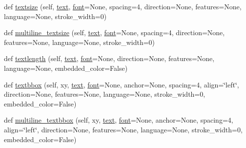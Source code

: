 \begin{DoxyCompactItemize}
\item 
def \hyperlink{classPIL_1_1ImageDraw_1_1ImageDraw_a54669e83a0653b1501b9e60efdc0ee0c}{textsize} (self, \hyperlink{classPIL_1_1ImageDraw_1_1ImageDraw_a13be584a7af12b6ed0b118bfb15f6030}{text}, \hyperlink{classPIL_1_1ImageDraw_1_1ImageDraw_a1a0babedef110fd4d10b55fa4041024d}{font}=None, spacing=4, direction=None, features=None, language=None, stroke\+\_\+width=0)
\item 
def \hyperlink{classPIL_1_1ImageDraw_1_1ImageDraw_af7cc0cddefee8cb0b2c4d4ce0fa1e0c4}{multiline\+\_\+textsize} (self, \hyperlink{classPIL_1_1ImageDraw_1_1ImageDraw_a13be584a7af12b6ed0b118bfb15f6030}{text}, \hyperlink{classPIL_1_1ImageDraw_1_1ImageDraw_a1a0babedef110fd4d10b55fa4041024d}{font}=None, spacing=4, direction=None, features=None, language=None, stroke\+\_\+width=0)
\item 
def \hyperlink{classPIL_1_1ImageDraw_1_1ImageDraw_ad9c330363e39cdc22ebd7c2207d72f6e}{textlength} (self, \hyperlink{classPIL_1_1ImageDraw_1_1ImageDraw_a13be584a7af12b6ed0b118bfb15f6030}{text}, \hyperlink{classPIL_1_1ImageDraw_1_1ImageDraw_a1a0babedef110fd4d10b55fa4041024d}{font}=None, direction=None, features=None, language=None, embedded\+\_\+color=False)
\item 
def \hyperlink{classPIL_1_1ImageDraw_1_1ImageDraw_a4a3000eb5f5eec27916af4cfdcdca9f4}{textbbox} (self, xy, \hyperlink{classPIL_1_1ImageDraw_1_1ImageDraw_a13be584a7af12b6ed0b118bfb15f6030}{text}, \hyperlink{classPIL_1_1ImageDraw_1_1ImageDraw_a1a0babedef110fd4d10b55fa4041024d}{font}=None, anchor=None, spacing=4, align=\char`\"{}left\char`\"{}, direction=None, features=None, language=None, stroke\+\_\+width=0, embedded\+\_\+color=False)
\item 
def \hyperlink{classPIL_1_1ImageDraw_1_1ImageDraw_ae071b54917d5a612d97e67b7711f1d6c}{multiline\+\_\+textbbox} (self, xy, \hyperlink{classPIL_1_1ImageDraw_1_1ImageDraw_a13be584a7af12b6ed0b118bfb15f6030}{text}, \hyperlink{classPIL_1_1ImageDraw_1_1ImageDraw_a1a0babedef110fd4d10b55fa4041024d}{font}=None, anchor=None, spacing=4, align=\char`\"{}left\char`\"{}, direction=None, features=None, language=None, stroke\+\_\+width=0, embedded\+\_\+color=False)
\end{DoxyCompactItemize}
